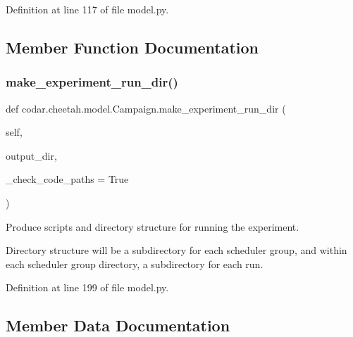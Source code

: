 Definition at line 117 of file model.\+py.



\subsection{Member Function Documentation}
\mbox{\label{classcodar_1_1cheetah_1_1model_1_1_campaign_a09266b3421f37a82d8e12c1272e3f54b}} 
\subsubsection{\texorpdfstring{make\+\_\+experiment\+\_\+run\+\_\+dir()}{make\_experiment\_run\_dir()}}
{\footnotesize\ttfamily def codar.\+cheetah.\+model.\+Campaign.\+make\+\_\+experiment\+\_\+run\+\_\+dir (\begin{DoxyParamCaption}\item[{}]{self,  }\item[{}]{output\+\_\+dir,  }\item[{}]{\+\_\+check\+\_\+code\+\_\+paths = {\ttfamily True} }\end{DoxyParamCaption})}

\begin{DoxyVerb}Produce scripts and directory structure for running the experiment.

Directory structure will be a subdirectory for each scheduler group,
and within each scheduler group directory, a subdirectory for each
run.\end{DoxyVerb}
 

Definition at line 199 of file model.\+py.



\subsection{Member Data Documentation}
\mbox{\label{classcodar_1_1cheetah_1_1model_1_1_campaign_a434f06408e6b364e0efc232fa107eb33}} 
